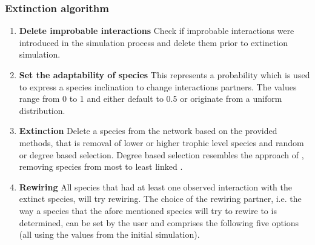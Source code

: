 \documentclass[12pt,a4paper]{article}
\begin{document}
\subsubsection{Extinction algorithm} \label{subsec:extc_alg}
\begin{enumerate} 
	\item \textbf{Delete improbable interactions} {\small Check if improbable interactions were introduced in the simulation process and delete them prior to extinction simulation.}
	\item \textbf{Set the adaptability of species} {\small This represents a probability which is used to express a species inclination to change interactions partners. The values range from 0 to 1 and either default to 0.5 or originate from a uniform distribution.}
	\item \label{itm:etxc} \textbf{Extinction} {\small Delete a species from the network based on the provided methods, that is removal of lower or higher trophic level species and random or degree based selection. Degree based selection resembles the approach of \citeauthor{Memmott2004}, removing species from most to least linked \parencite{Memmott2004}.}
	\item \label{itm:rew} \textbf{Rewiring} {\small All species that had at least one observed interaction with the extinct species, will try rewiring. The choice of the rewiring partner, i.e. the way a species that the afore mentioned species will try to rewire to is determined, can be set by the user and comprises the following five options (all using the values from the initial simulation).}

\end{enumerate}
\end{document}
